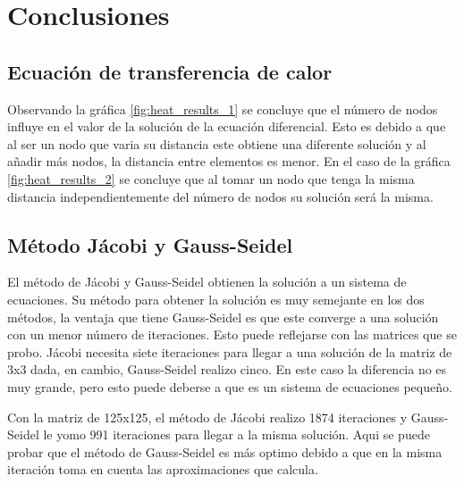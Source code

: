 \section{Conclusiones}

\subsection{Ecuación de transferencia de calor}

Observando la gráfica \ref{fig:heat_results_1} se concluye que el número de nodos influye en el valor de la solución de la ecuación diferencial. Esto es debido a que al ser un nodo que varia su distancia este obtiene una diferente solución y al añadir más nodos, la distancia entre elementos es menor. En el caso de la gráfica \ref{fig:heat_results_2} se concluye que al tomar un nodo que tenga la misma distancia independientemente del número de nodos su solución será la misma.

\subsection{Método Jácobi y Gauss-Seidel}

El método de Jácobi y Gauss-Seidel obtienen la solución a un sistema de ecuaciones. Su método para obtener la solución es muy semejante en los dos métodos, la ventaja que tiene Gauss-Seidel es que este converge a una solución con un menor número de iteraciones. Esto puede reflejarse con las matrices que se probo. Jácobi necesita siete iteraciones para llegar a una solución de la matriz de 3x3 dada, en cambio, Gauss-Seidel realizo cinco. En este caso la diferencia no es muy grande, pero esto puede deberse a que es un sistema de ecuaciones pequeño.

Con la matriz de 125x125, el método de Jácobi realizo 1874 iteraciones y Gauss-Seidel le yomo 991 iteraciones para llegar a la misma solución. Aqui se puede probar que el método de Gauss-Seidel es más optimo debido a que en la misma iteración toma en cuenta las aproximaciones que calcula.